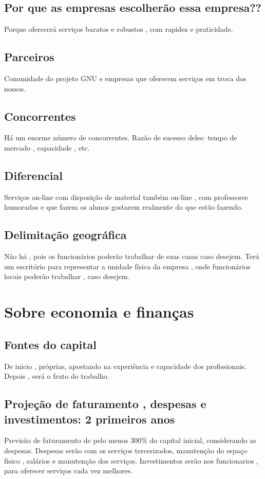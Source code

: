 \documentclass[10pt]{article}
\begin{document}
\subsection{Por que as empresas escolherão essa empresa??}
Porque oferecerá serviços baratos e robustos , com rapidez e praticidade.

\subsection{Parceiros} 
Comunidade do projeto GNU e empresas que oferecem serviços em troca dos nossos.

\subsection{Concorrentes}
Há um enorme número de concorrentes. Razão de sucesso deles: tempo de mercado , capacidade , etc.

\subsection{Diferencial}
Serviços on-line com disposição de material também on-line , com professores humorados e que fazem os alunos gostarem realmente do que estão fazendo.

\subsection{Delimitação geográfica}
Não há , pois os funcionários poderão trabalhar de suas casas caso desejem. Terá um escritório para representar a unidade física da empresa , onde funcionários locais poderão trabalhar , caso desejem.

\section{Sobre economia e finanças}

\subsection{Fontes do capital} 
De inicio , próprias, apostando na experiência e capacidade dos profissionais. Depois , será o fruto do trabalho.

\subsection{Projeção de faturamento , despesas e investimentos: 2 primeiros anos}
Previsão de faturamento de pelo menos 300\% do capital inicial, considerando as despesas. Despesas serão com os serviços tercerizados, manutenção do espaço físico , salários e manutenção dos serviços. Investimentos serão nos funcionarios , para oferecer serviços cada vez melhores.
\end{document}
